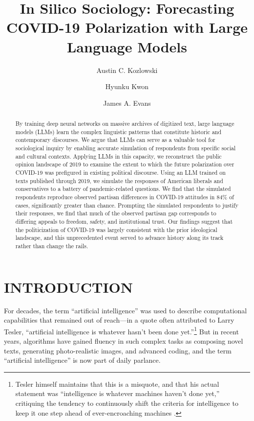 \documentclass{article} %
\title{In Silico Sociology: Forecasting COVID-19 Polarization with Large Language Models}
\author[1]{Austin C. Kozlowski\orcidA{}}
\author[2]{Hyunku Kwon\orcidB{}}
\author[3]{James A. Evans\orcidC{}}
\affil[1, 2, 3]{Department of Sociology, University of Chicago}
\affil[3]{Santa Fe Institute}
\begin{document}

  \maketitle

  \begin{abstract}
    By training deep neural networks on massive archives of digitized text,
    large language models (LLMs) learn the complex linguistic patterns that
    constitute historic and contemporary discourses. We argue that LLMs can
    serve as a valuable tool for sociological inquiry by enabling accurate
    simulation of respondents from specific social and cultural contexts.
    Applying LLMs in this capacity, we reconstruct the public opinion
    landscape of 2019 to examine the extent to which the future polarization
    over COVID-19 was prefigured in existing political discourse. Using an
    LLM trained on texts published through 2019, we simulate the responses
    of American liberals and conservatives to a battery of pandemic-related
    questions. We find that the simulated respondents reproduce observed
    partisan differences in COVID-19 attitudes in 84\% of cases,
    significantly greater than chance. Prompting the simulated respondents
    to justify their responses, we find that much of the observed partisan
    gap corresponds to differing appeals to freedom, safety, and
    institutional trust. Our findings suggest that the politicization of
    COVID-19 was largely consistent with the prior ideological landscape,
    and this unprecedented event served to advance history along its track
    rather than change the rails.
  \end{abstract}
  \vspace{0.35cm}


\section*{INTRODUCTION}

For decades, the term ``artificial intelligence'' was used to describe
computational capabilities that remained out of reach---in a quote often
attributed to Larry Tesler, ``artificial intelligence is whatever hasn't
been done yet.''\footnote{Tesler himself maintains that this is a
  misquote, and that his actual statement was ``intelligence is whatever
  machines haven't done yet,'' critiquing the tendency
  to continuously shift the criteria for intelligence to keep it one
  step ahead of ever-encroaching machines \parencite{Tesler2010-ty}.} But in
recent years, algorithms have gained fluency in such complex tasks as
composing novel texts, generating photo-realistic images, and advanced
coding, and the term ``artificial intelligence'' is now part of daily
parlance.
\end{document}
